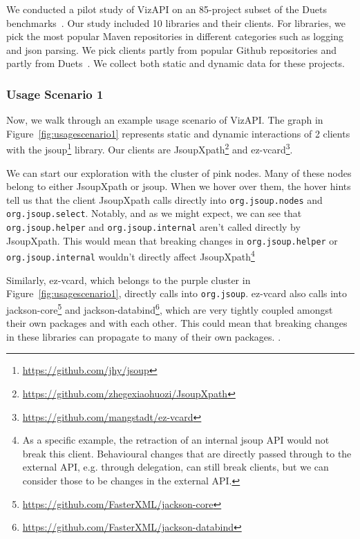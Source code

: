 \label{sec:evaluation}

We conducted a pilot study of VizAPI on an 85-project subset of the
Duets benchmarks~\cite{durieux21}. Our study included 10 libraries and
their clients. For libraries, we pick the most popular Maven repositories 
in different categories such as logging and json parsing. We pick clients partly
from popular Github repositories and partly from Duets~\cite{durieux21}.
We collect both static and dynamic data for these projects.

\subsubsection{Usage Scenario 1}
Now, we walk through an example usage scenario of VizAPI.
The graph in Figure~\ref{fig:usagescenario1} represents static and dynamic interactions of 2 clients with the jsoup\footnote{\url{https://github.com/jhy/jsoup}\label{jsoup}} library. Our clients are JsoupXpath\footnote{\url{https://github.com/zhegexiaohuozi/JsoupXpath}\label{jsoupxpath}} and ez-vcard\footnote{\url{https://github.com/mangstadt/ez-vcard}\label{ez-vcard}}.

We can start our exploration with the cluster of pink nodes. Many of these nodes belong to either JsoupXpath or jsoup. When we hover over them, the hover hints tell us that the client JsoupXpath calls directly into \texttt{org.jsoup.nodes} and \texttt{org.jsoup.select}. Notably, and as we might expect, we can see that \texttt{org.jsoup.helper} and \texttt{org.jsoup.internal} aren't called directly by JsoupXpath. This would mean that breaking changes in \texttt{org.jsoup.helper} or \texttt{org.jsoup.internal} wouldn't directly affect JsoupXpath\footnote{As a specific example, the retraction of an internal jsoup API would not break this client. Behavioural changes that are directly passed through to the external API, e.g. through delegation, can still break clients, but we can consider those to be changes in the external API.} 

Similarly, ez-vcard, which belongs to the purple cluster in Figure~\ref{fig:usagescenario1}, directly calls into \texttt{org.jsoup}. ez-vcard also calls into jackson-core\footnote{\url{https://github.com/FasterXML/jackson-core}\label{jackson-core}} and jackson-databind\footnote{\url{https://github.com/FasterXML/jackson-databind}\label{jackson-databind}}, which are very tightly coupled amongst their own packages and with each other. This could mean that breaking changes in these libraries can propagate to many of their own packages.
.

